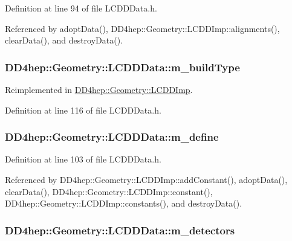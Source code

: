 Definition at line 94 of file LCDDData.h.

Referenced by adoptData(), DD4hep::Geometry::LCDDImp::alignments(), clearData(), and destroyData().\hypertarget{class_d_d4hep_1_1_geometry_1_1_l_c_d_d_data_aac00f4e1c495c5fb7a80037be3acb19e}{
\subsubsection[{m\_\-buildType}]{ {\bf DD4hep::Geometry::LCDDData::m\_\-buildType}}}
\label{class_d_d4hep_1_1_geometry_1_1_l_c_d_d_data_aac00f4e1c495c5fb7a80037be3acb19e}


Reimplemented in \hyperlink{class_d_d4hep_1_1_geometry_1_1_l_c_d_d_imp_a5cd51ba18f6d2e7723acc93d9b7a90e4}{DD4hep::Geometry::LCDDImp}.

Definition at line 116 of file LCDDData.h.\hypertarget{class_d_d4hep_1_1_geometry_1_1_l_c_d_d_data_ab24af8c4cd206da5d25f3186498530f7}{
\subsubsection[{m\_\-define}]{ {\bf DD4hep::Geometry::LCDDData::m\_\-define}}}
\label{class_d_d4hep_1_1_geometry_1_1_l_c_d_d_data_ab24af8c4cd206da5d25f3186498530f7}


Definition at line 103 of file LCDDData.h.

Referenced by DD4hep::Geometry::LCDDImp::addConstant(), adoptData(), clearData(), DD4hep::Geometry::LCDDImp::constant(), DD4hep::Geometry::LCDDImp::constants(), and destroyData().\hypertarget{class_d_d4hep_1_1_geometry_1_1_l_c_d_d_data_af9733efff6b4cb6c8db334a65bff61c7}{
\subsubsection[{m\_\-detectors}]{ {\bf DD4hep::Geometry::LCDDData::m\_\-detectors}}}
\label{class_d_d4hep_1_1_geometry_1_1_l_c_d_d_data_af9733efff6b4cb6c8db334a65bff61c7}


